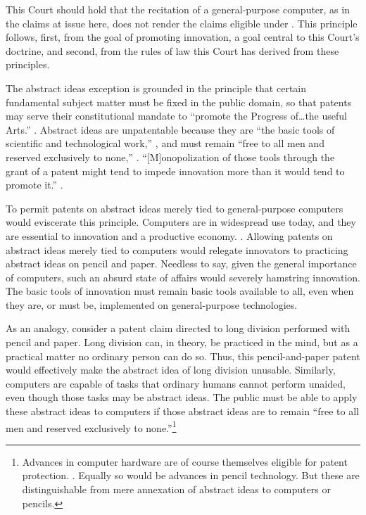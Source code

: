 \documentclass{scotus}
\begin{document}
This Court should hold that the recitation of a
general-purpose computer, as in the claims at issue here, does not render the
claims eligible under .
This principle follows, first, from the goal of promoting innovation, a goal
central to
this Court's  doctrine, and second, from the rules of law
this Court has derived from these principles.

The abstract ideas exception is grounded in the principle that certain
fundamental subject matter must be fixed in the public domain, so that
patents may serve their constitutional mandate to ``promote the Progress
of\ldots the useful Arts.'' .
Abstract ideas are unpatentable because they
are ``the basic tools of scientific and technological work,'' , and must remain ``free to all men and reserved exclusively to none,''
. ``[M]onopolization
of those tools through the grant of a patent might tend to impede innovation
more than it would tend to promote it.'' .

To permit patents on abstract ideas merely tied to general-purpose computers
would eviscerate this principle.
Computers are in
widespread use today, and they are essential to innovation and a productive
economy. . 
Allowing patents on abstract ideas merely tied to computers
would relegate
innovators to practicing abstract ideas on pencil and
paper. Needless to say, given the general importance of computers, such an
absurd state of affairs would severely hamstring innovation.
The basic tools of innovation must remain basic tools available to all, even
when they are, or must be, implemented on general-purpose technologies.

As an analogy, consider a patent claim directed to long division performed with
pencil and paper. Long division can, in theory, be practiced in the mind, but
as a practical matter no ordinary person can do so. Thus, this pencil-and-paper
patent would effectively make the abstract idea of long division unusable.
Similarly, computers are capable of tasks that ordinary
humans cannot perform unaided, even though those tasks may be
abstract ideas. The public must be able to apply these abstract ideas to
computers if those abstract ideas are to
remain ``free to all men and reserved exclusively to none.''\footnote{%
Advances in computer hardware are of course themselves eligible for patent
protection.  . Equally so would be advances in pencil technology. But these are
distinguishable from mere annexation of abstract ideas to computers or pencils.}
\end{document}
